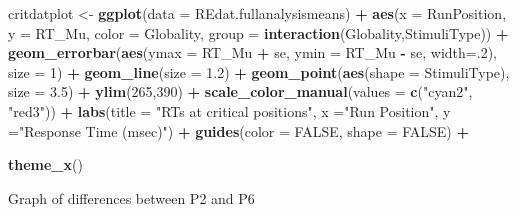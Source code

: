 \documentclass[
]{article}
\newenvironment{Shaded}{\begin{snugshade}}{\end{snugshade}}
\newcommand{\DataTypeTok}[1]{\textcolor[rgb]{0.13,0.29,0.53}{#1}}
\newcommand{\DecValTok}[1]{\textcolor[rgb]{0.00,0.00,0.81}{#1}}
\newcommand{\FloatTok}[1]{\textcolor[rgb]{0.00,0.00,0.81}{#1}}
\newcommand{\KeywordTok}[1]{\textcolor[rgb]{0.13,0.29,0.53}{\textbf{#1}}}
\newcommand{\NormalTok}[1]{#1}
\newcommand{\OperatorTok}[1]{\textcolor[rgb]{0.81,0.36,0.00}{\textbf{#1}}}
\newcommand{\OtherTok}[1]{\textcolor[rgb]{0.56,0.35,0.01}{#1}}
\newcommand{\StringTok}[1]{\textcolor[rgb]{0.31,0.60,0.02}{#1}}
\begin{document}
\begin{Shaded}
\begin{Highlighting}[]
\NormalTok{critdatplot <-}\StringTok{ }\KeywordTok{ggplot}\NormalTok{(}\DataTypeTok{data =}\NormalTok{ REdat.fullanalysismeans) }\OperatorTok{+}
\StringTok{  }\KeywordTok{aes}\NormalTok{(}\DataTypeTok{x =}\NormalTok{ RunPosition, }
      \DataTypeTok{y =}\NormalTok{ RT_Mu,}
      \DataTypeTok{color =}\NormalTok{ Globality,}
      \DataTypeTok{group =} \KeywordTok{interaction}\NormalTok{(Globality,StimuliType)) }\OperatorTok{+}
\StringTok{  }\KeywordTok{geom_errorbar}\NormalTok{(}\KeywordTok{aes}\NormalTok{(}\DataTypeTok{ymax =}\NormalTok{ RT_Mu }\OperatorTok{+}\StringTok{ }\NormalTok{se, }
                    \DataTypeTok{ymin =}\NormalTok{ RT_Mu }\OperatorTok{-}\StringTok{ }\NormalTok{se, }
                \DataTypeTok{width=}\NormalTok{.}\DecValTok{2}\NormalTok{), }\DataTypeTok{size =} \DecValTok{1}\NormalTok{) }\OperatorTok{+}
\StringTok{  }\KeywordTok{geom_line}\NormalTok{(}\DataTypeTok{size =} \FloatTok{1.2}\NormalTok{) }\OperatorTok{+}
\StringTok{  }\KeywordTok{geom_point}\NormalTok{(}\KeywordTok{aes}\NormalTok{(}\DataTypeTok{shape =}\NormalTok{ StimuliType), }\DataTypeTok{size =} \FloatTok{3.5}\NormalTok{) }\OperatorTok{+}
\StringTok{  }\KeywordTok{ylim}\NormalTok{(}\DecValTok{265}\NormalTok{,}\DecValTok{390}\NormalTok{) }\OperatorTok{+}
\StringTok{  }\KeywordTok{scale_color_manual}\NormalTok{(}\DataTypeTok{values =} \KeywordTok{c}\NormalTok{(}\StringTok{"cyan2"}\NormalTok{, }\StringTok{"red3"}\NormalTok{)) }\OperatorTok{+}
\StringTok{  }\KeywordTok{labs}\NormalTok{(}\DataTypeTok{title =} \StringTok{"RTs at critical positions"}\NormalTok{,}
       \DataTypeTok{x =}\StringTok{"Run Position"}\NormalTok{, }
       \DataTypeTok{y =}\StringTok{"Response Time (msec)"}\NormalTok{) }\OperatorTok{+}
\StringTok{   }\KeywordTok{guides}\NormalTok{(}\DataTypeTok{color =} \OtherTok{FALSE}\NormalTok{, }\DataTypeTok{shape =} \OtherTok{FALSE}\NormalTok{) }\OperatorTok{+}

\StringTok{  }\KeywordTok{theme_x}\NormalTok{()}
\end{Highlighting}
\end{Shaded}

Graph of differences between P2 and P6
\end{document}

